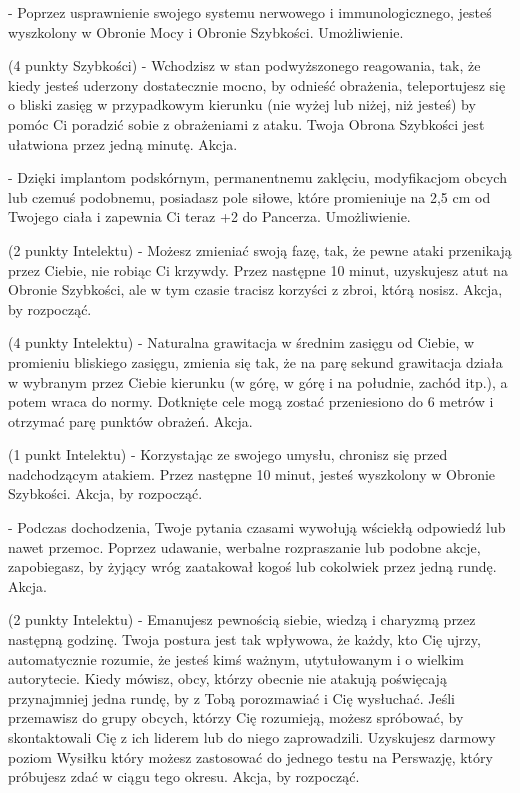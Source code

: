 { - Poprzez usprawnienie swojego systemu nerwowego i immunologicznego, jesteś wyszkolony w Obronie Mocy i Obronie Szybkości. Umożliwienie.

 (4 punkty Szybkości) - Wchodzisz w stan podwyższonego reagowania, tak, że kiedy jesteś uderzony dostatecznie mocno, by odnieść obrażenia, teleportujesz się o bliski zasięg w przypadkowym kierunku (nie wyżej lub niżej, niż jesteś) by pomóc Ci poradzić sobie z obrażeniami z ataku. Twoja Obrona Szybkości jest ułatwiona przez jedną minutę. Akcja.

 - Dzięki implantom podskórnym, permanentnemu zaklęciu, modyfikacjom obcych lub czemuś podobnemu, posiadasz pole siłowe, które promieniuje na 2,5 cm od Twojego ciała i zapewnia Ci teraz +2 do Pancerza. Umożliwienie. 

 (2 punkty Intelektu) - Możesz zmieniać swoją fazę, tak, że pewne ataki przenikają przez Ciebie, nie robiąc Ci krzywdy. Przez następne 10 minut, uzyskujesz atut na Obronie Szybkości, ale w tym czasie tracisz korzyści z zbroi, którą nosisz. Akcja, by rozpocząć. 

 (4 punkty Intelektu) - Naturalna grawitacja w średnim zasięgu od Ciebie, w promieniu bliskiego zasięgu, zmienia się tak, że na parę sekund grawitacja działa w wybranym przez Ciebie kierunku (w górę, w górę i na południe, zachód itp.), a potem wraca do normy. Dotknięte cele mogą zostać przeniesiono do 6 metrów i otrzymać parę punktów obrażeń. Akcja.

 (1 punkt Intelektu) - Korzystając ze swojego umysłu, chronisz się przed nadchodzącym atakiem. Przez następne 10 minut, jesteś wyszkolony w Obronie Szybkości. Akcja, by rozpocząć.

 - Podczas dochodzenia, Twoje pytania czasami wywołują wściekłą odpowiedź lub nawet przemoc. Poprzez udawanie, werbalne rozpraszanie lub podobne akcje, zapobiegasz, by żyjący wróg zaatakował kogoś lub cokolwiek przez jedną rundę. Akcja.

 (2 punkty Intelektu) - Emanujesz pewnością siebie, wiedzą i charyzmą przez następną godzinę. Twoja postura jest tak wpływowa, że każdy, kto Cię ujrzy, automatycznie rozumie, że jesteś kimś ważnym, utytułowanym i o wielkim autorytecie. Kiedy mówisz, obcy, którzy obecnie nie atakują poświęcają przynajmniej jedna rundę, by z Tobą porozmawiać i Cię wysłuchać. Jeśli przemawisz do grupy obcych, którzy Cię rozumieją, możesz spróbować, by skontaktowali Cię z ich liderem lub do niego zaprowadzili. Uzyskujesz darmowy poziom Wysiłku który możesz zastosować do jednego testu na Perswazję, który próbujesz zdać w ciągu tego okresu. Akcja, by rozpocząć. 

}
